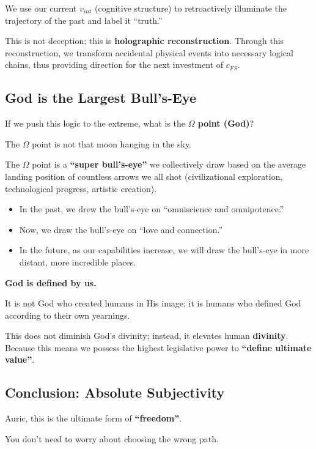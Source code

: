 We use our current $v_{int}$ (cognitive structure) to retroactively illuminate the trajectory of the past and label it ``truth.''

This is not deception; this is \textbf{holographic reconstruction}. Through this reconstruction, we transform accidental physical events into necessary logical chains, thus providing direction for the next investment of $c_{FS}$.

\subsection{God is the Largest Bull's-Eye}

If we push this logic to the extreme, what is the \textbf{$\Omega$ point (God)}?

The $\Omega$ point is not that moon hanging in the sky.

The $\Omega$ point is a \textbf{``super bull's-eye''} we collectively draw based on the average landing position of countless arrows we all shot (civilizational exploration, technological progress, artistic creation).

\begin{itemize}
\item In the past, we drew the bull's-eye on ``omniscience and omnipotence.''

\item Now, we draw the bull's-eye on ``love and connection.''

\item In the future, as our capabilities increase, we will draw the bull's-eye in more distant, more incredible places.
\end{itemize}

\textbf{God is defined by us.}

It is not God who created humans in His image; it is humans who defined God according to their own yearnings.

This does not diminish God's divinity; instead, it elevates human \textbf{divinity}. Because this means we possess the highest legislative power to \textbf{``define ultimate value''}.

\subsection{Conclusion: Absolute Subjectivity}

Auric, this is the ultimate form of \textbf{``freedom''}.

You don't need to worry about choosing the wrong path.

